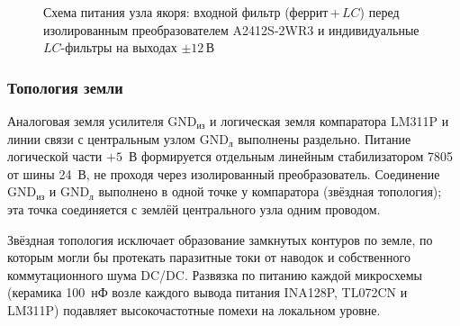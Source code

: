 \begin{figure}[h!]
\centering
{}
\caption{Схема питания узла якоря: входной фильтр (феррит\,+\,$LC$) перед изолированным
преобразователем A2412S-2WR3 и индивидуальные $LC$-фильтры на выходах $\pm 12$\,В}
\label{fig:anchor-power}
\end{figure}

\subsubsection{Топология земли}

Аналоговая земля усилителя GND$_{\text{из}}$ и логическая земля компаратора LM311P
и линии связи с центральным узлом GND$_{\text{л}}$ выполнены раздельно. Питание
логической части $+5$~В формируется отдельным линейным стабилизатором 7805 от шины
24~В, не проходя через изолированный преобразователь. Соединение GND$_{\text{из}}$ и
GND$_{\text{л}}$ выполнено в одной точке у компаратора (звёздная топология); эта точка
соединяется с землёй центрального узла одним проводом.

Звёздная топология исключает образование замкнутых контуров по земле, по которым
могли бы протекать паразитные токи от наводок и собственного коммутационного шума
DC/DC. Развязка по питанию каждой микросхемы (керамика 100~нФ возле каждого вывода
питания INA128P, TL072CN и LM311P) подавляет высокочастотные помехи на локальном уровне.

